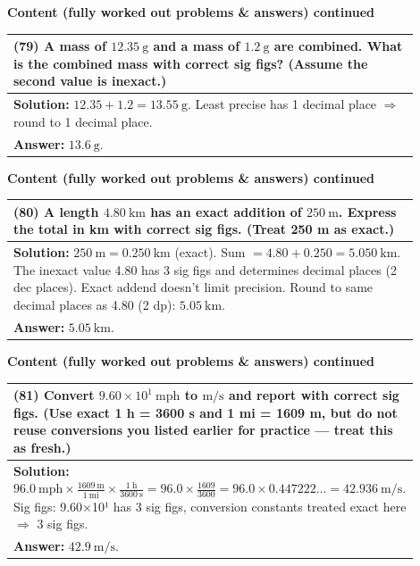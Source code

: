 \documentclass{article}
\begin{document}
\noindent
{\large \textbf{Content (fully worked out problems \& answers) continued}} \\[0.2em]
\begin{tabular}{|p{0.9\linewidth}|}
\hline
\vspace{0.2cm}

\textbf{(79)} A mass of $12.35~\text{g}$ and a mass of $1.2~\text{g}$ are combined. What is the combined mass with correct sig figs? (Assume the second value is inexact.) \\
\hline
\vspace{0.2cm}
\textbf{Solution:} $12.35+1.2=13.55~\text{g}$. Least precise has 1 decimal place $\Rightarrow$ round to 1 decimal place. \\
\textbf{Answer:} $13.6~\text{g}$. \\
\hline
\end{tabular}
\newpage

\noindent
{\large \textbf{Content (fully worked out problems \& answers) continued}} \\[0.2em]
\begin{tabular}{|p{0.9\linewidth}|}
\hline
\vspace{0.2cm}

\textbf{(80)} A length $4.80~\text{km}$ has an exact addition of $250~\text{m}$. Express the total in km with correct sig figs. (Treat 250 m as exact.) \\
\hline
\vspace{0.2cm}
\textbf{Solution:} $250~\text{m}=0.250~\text{km}$ (exact). Sum $=4.80+0.250=5.050~\text{km}$. The inexact value 4.80 has 3 sig figs and determines decimal places (2 dec places). Exact addend doesn't limit precision. Round to same decimal places as 4.80 (2 dp): $5.05~\text{km}$. \\
\textbf{Answer:} $5.05~\text{km}$. \\
\hline
\end{tabular}
\newpage

\noindent
{\large \textbf{Content (fully worked out problems \& answers) continued}} \\[0.2em]
\begin{tabular}{|p{0.9\linewidth}|}
\hline
\vspace{0.2cm}

\textbf{(81)} Convert $9.60\times 10^{1}~\text{mph}$ to $\text{m/s}$ and report with correct sig figs. (Use exact 1 h = 3600 s and 1 mi = 1609 m, but do not reuse conversions you listed earlier for practice — treat this as fresh.) \\
\hline
\vspace{0.2cm}
\textbf{Solution:} $96.0~\text{mph}\times\frac{1609~\text{m}}{1~\text{mi}}\times\frac{1~\text{h}}{3600~\text{s}}=96.0\times\frac{1609}{3600}=96.0\times0.447222\dots=42.936~\text{m/s}$. Sig figs: 9.60×10¹ has 3 sig figs, conversion constants treated exact here $\Rightarrow$ 3 sig figs. \\
\textbf{Answer:} $42.9~\text{m/s}$. \\
\hline
\end{tabular}
\newpage
\end{document}
